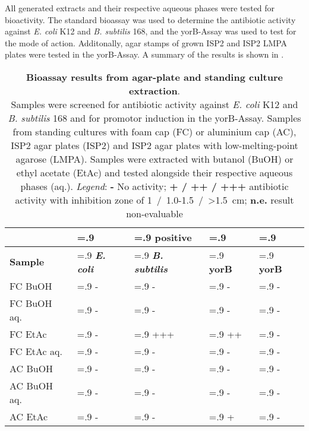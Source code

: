     All generated extracts and their respective aqueous phases were tested for bioactivity. The standard bioassay was used to determine the antibiotic activity against \textit{E. coli} K12 and \textit{B. subtilis} 168, and the yorB-Assay was used to test for the mode of action. Additonally, agar stamps of grown ISP2 and ISP2 LMPA plates were tested in the yorB-Assay. A summary of the results is shown in .

    \begin{table}[htbp]
        \caption[Bioassay results from agar-plate and standing culture extraction]{\textbf{Bioassay results from agar-plate and standing culture extraction}.\\
        Samples were screened for antibiotic activity against \textit{E. coli} K12 and \textit{B. subtilis} 168 and for promotor induction in the yorB-Assay.
        Samples from standing cultures with foam cap (FC) or aluminium cap (AC), ISP2 agar plates (ISP2) and ISP2 agar plates with low-melting-point agarose (LMPA). Samples were extracted with butanol (BuOH) or ethyl acetate (EtAc) and tested alongside their respective aqueous phases (aq.). \emph{Legend}: \textbf{-} No activity; \textbf{+ / ++ / +++} antibiotic activity with inhibition zone of 1~/~1.0-1.5~/~>1.5~cm; \textbf{n.e.} result non-evaluable}
        \label{tab:yorB_assay_results}
        \centering
        \begin{tabularx}{\textwidth}{>{\hsize=1.4\hsize}X>{\hsize=.9\hsize}X>{\hsize=.9\hsize}X>{\hsize=.9\hsize}X>{\hsize=.9\hsize}X}
            \toprule
            & \multicolumn{3}{c}{Antibacterial} & positive \\
            \cline{2-4}
            \textbf{Sample} & \textbf{\textit{E. coli}}     & \textbf{\textit{B. subtilis}}  & \textbf{yorB}  & \textbf{yorB}    \\
            \midrule
            FC BuOH         & -     & -     & -     & -    \\
            FC BuOH aq.     & -     & -     & -     & -    \\
            FC EtAc         & -     & +++   & ++    & -    \\
            FC EtAc aq.     & -     & -     & -     & -    \\
            AC BuOH         & -     & -     & -     & -    \\
            AC BuOH aq.     & -     & -     & -     & -    \\
            AC EtAc         & -     & -     & +     & -    \\

\end{tabularx}
\end{table}
